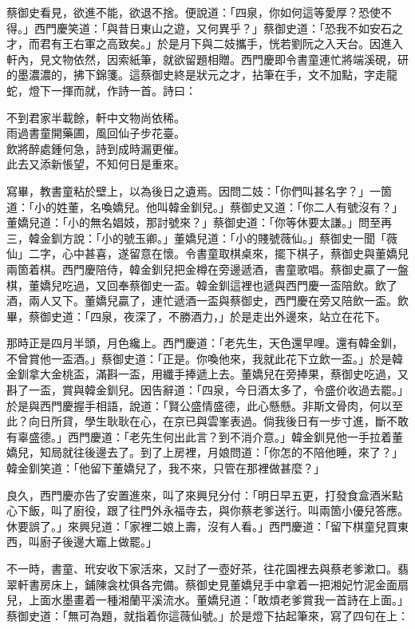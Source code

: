蔡御史看見，欲進不能，欲退不捨。便說道：「四泉，你如何這等愛厚？恐使不得。」西門慶笑道：「與昔日東山之遊，又何異乎？」蔡御史道：「恐我不如安石之才，而君有王右軍之高致矣。」於是月下與二妓攜手，恍若劉阮之入天台。因進入軒內，見文物依然，因索紙筆，就欲留題相贈。西門慶即令書童連忙將端溪硯，研的墨濃濃的，拂下錦箋。這蔡御史終是狀元之才，拈筆在手，文不加點，字走龍蛇，燈下一揮而就，作詩一首。詩曰：

\begin{myquote} 
不到君家半載餘，軒中文物尚依稀。\\雨過書童開藥圃，風回仙子步花臺。\\飲將醉處鍾何急，詩到成時漏更催。\\此去又添新悵望，不知何日是重來。
\end{myquote} 

寫畢，教書童粘於壁上，以為後日之遺焉。因問二妓：「你們叫甚名字？」一箇道：「小的姓董，名喚嬌兒。他叫韓金釧兒。」蔡御史又道：「你二人有號沒有？」董嬌兒道：「小的無名娼妓，那討號來？」蔡御史道：「你等休要太謙。」問至再三，韓金釧方說：「小的號玉卿。」董嬌兒道：「小的賤號薇仙。」{}蔡御史一聞「薇仙」二字，心中甚喜，遂留意在懷。令書童取棋桌來，擺下棋子，蔡御史與董嬌兒兩箇着棋。西門慶陪侍，韓金釧兒把金樽在旁邊遞酒，書童歌唱。蔡御史贏了一盤棋，董嬌兒吃過，又回奉蔡御史一盃。韓金釧這裡也遞與西門慶一盃陪飲。飲了酒，兩人又下。董嬌兒贏了，連忙遞酒一盃與蔡御史，西門慶在旁又陪飲一盃。飲畢，蔡御史道：「四泉，夜深了，不勝酒力，」於是走出外邊來，站立在花下。

那時正是四月半頭，月色纔上。西門慶道：「老先生，天色還早哩。還有韓金釧，不曾賞他一盃酒。」蔡御史道：「正是。你喚他來，我就此花下立飲一盃。」於是韓金釧拿大金桃盃，滿斟一盃，用纖手捧遞上去。董嬌兒在旁捧果，蔡御史吃過，又斟了一盃，賞與韓金釧兒。因告辭道：「四泉，今日酒太多了，令盛价收過去罷。」於是與西門慶握手相語，說道：「賢公盛情盛德，此心懸懸。非斯文骨肉，何以至此？向日所貸，學生耿耿在心，在京已與雲峯表過。倘我後日有一步寸進，斷不敢有辜盛德。」西門慶道：「老先生何出此言？到不消介意。」韓金釧見他一手拉着董嬌兒，知局就往後邊去了。到了上房裡，月娘問道：「你怎的不陪他睡，來了？」韓金釧笑道：「他留下董嬌兒了，我不來，只管在那裡做甚麼？」

良久，西門慶亦告了安置進來，叫了來興兒分付：「明日早五更，打發食盒酒米點心下飯，叫了廚役，跟了往門外永福寺去，與你蔡老爹送行。叫兩箇小優兒答應。休要誤了。」來興兒道：「家裡二娘上壽，沒有人看。」西門慶道：「留下棋童兒買東西，叫廚子後邊大竈上做罷。」

不一時，書童、玳安收下家活來，又討了一壺好茶，往花園裡去與蔡老爹漱口。翡翠軒書房床上，鋪陳衾枕俱各完備。蔡御史見董嬌兒手中拿着一把湘妃竹泥金面扇兒，上面水墨畫着一種湘蘭平溪流水。董嬌兒道：「敢煩老爹賞我一首詩在上面。」蔡御史道：「無可為題，就指着你這薇仙號。」於是燈下拈起筆來，寫了四句在上：

